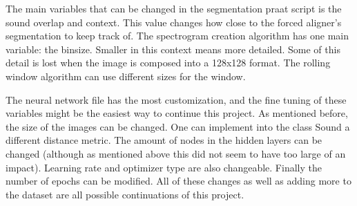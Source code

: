 \documentclass[10pt,twocolumn]{article}
\begin{document}
The main variables that can be changed in the segmentation praat script is the sound overlap and context. This value changes how close to the forced aligner’s segmentation to keep track of. The spectrogram creation algorithm has one main variable: the binsize. Smaller in this context means more detailed. Some of this detail is lost when the image is composed into a 128x128 format. The rolling window algorithm can use different sizes for the window.

The neural network file has the most customization, and the fine tuning of these variables might be the easiest way to continue this project. As mentioned before, the size of the images can be changed. One can implement into the class Sound a different distance metric. The amount of nodes in the hidden layers can be changed (although as mentioned above this did not seem to have too large of an impact). Learning rate and optimizer type are also changeable. Finally the number of epochs can be modified. All of these changes as well as adding more to the dataset are all possible continuations of this project. 

















\appendix


\printbibliography
\end{document}
